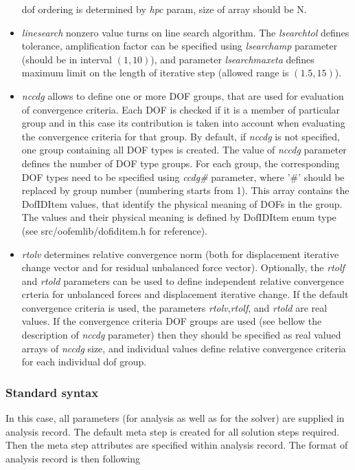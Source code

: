 \documentclass[a4paper]{article}
\newcommand{\param}[1]{{\em #1}}
\begin{document}
\begin{itemize}
dof ordering is determined by \param{hpc} param, size of array should
be N.
\item \param{linesearch} nonzero value turns on line search
  algorithm. The \param{lsearchtol} defines tolerance, amplification
  factor can be specified using \param{lsearchamp} parameter (should
  be in interval $(1,10)$), and parameter \param{lsearchmaxeta}
  defines maximum limit on the length of iterative step (allowed range
  is $(1.5,15)$).
\item \param{nccdg} allows to define one or more DOF groups, that are used for evaluation of convergence criteria. Each DOF is checked if it is a member of particular group and in this case its contribution is taken into account when evaluating the convergence criteria for that group. By default, if \param{nccdg} is not specified, one group containing all DOF types is created. The value of \param{nccdg} parameter defines the number of DOF type groups. For each group, the corresponding DOF types need to be specified using \param{ccdg\#} parameter, where '\#' should be replaced by group number (numbering starts from 1). This array contains the DofIDItem values, that identify the physical meaning of DOFs in the group. The values and their physical meaning is defined by DofIDItem enum type (see src/oofemlib/dofiditem.h for reference).
\item \param{rtolv} determines relative convergence norm (both for displacement
iterative change vector and for residual unbalanced force vector). Optionally, the \param{rtolf} and \param{rtold} parameters can be used to define
independent relative convergence crteria for unbalanced forces and displacement
iterative change. If the default convergence criteria is used,
the parameters \param{rtolv},\param{rtolf}, and \param{rtold} are real values. If the convergence criteria DOF groups are used (see bellow the description of \param{nccdg} parameter) then they should be specified as real valued arrays of \param{nccdg} size, and individual values define relative convergence criteria for each individual dof group.
\end{itemize}

\subsubsection{Standard syntax}
In this case, all parameters (for analysis as well as for the solver)
are supplied in analysis record. The default meta step is created for
all solution steps required. Then the meta step attributes are
specified within analysis record. The format of analysis record is
then following\\
\end{document}
